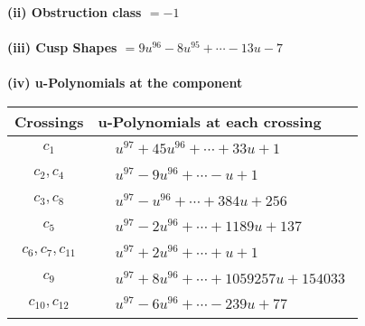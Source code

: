 \documentclass[1p]{elsarticle_modified}
\theoremstyle{definition}
\begin{document}
\flushleft \textbf{(ii) Obstruction class $= -1$}\\~\\
\flushleft \textbf{(iii) Cusp Shapes $= 9 u^{96}-8 u^{95}+\cdots-13 u-7$}\\~\\
\newpage\renewcommand{\arraystretch}{1}
\flushleft \textbf{(iv) u-Polynomials at the component}\newline \\
\begin{tabular}{m{50pt}|m{274pt}}
Crossings & \hspace{64pt}u-Polynomials at each crossing \\
\hline $$\begin{aligned}c_{1}\end{aligned}$$&$\begin{aligned}
&u^{97}+45 u^{96}+\cdots+33 u+1
\end{aligned}$\\
\hline $$\begin{aligned}c_{2},c_{4}\end{aligned}$$&$\begin{aligned}
&u^{97}-9 u^{96}+\cdots- u+1
\end{aligned}$\\
\hline $$\begin{aligned}c_{3},c_{8}\end{aligned}$$&$\begin{aligned}
&u^{97}- u^{96}+\cdots+384 u+256
\end{aligned}$\\
\hline $$\begin{aligned}c_{5}\end{aligned}$$&$\begin{aligned}
&u^{97}-2 u^{96}+\cdots+1189 u+137
\end{aligned}$\\
\hline $$\begin{aligned}c_{6},c_{7},c_{11}\end{aligned}$$&$\begin{aligned}
&u^{97}+2 u^{96}+\cdots+u+1
\end{aligned}$\\
\hline $$\begin{aligned}c_{9}\end{aligned}$$&$\begin{aligned}
&u^{97}+8 u^{96}+\cdots+1059257 u+154033
\end{aligned}$\\
\hline $$\begin{aligned}c_{10},c_{12}\end{aligned}$$&$\begin{aligned}
&u^{97}-6 u^{96}+\cdots-239 u+77
\end{aligned}$\\
\hline
\end{tabular}\\~\\
\end{document}
